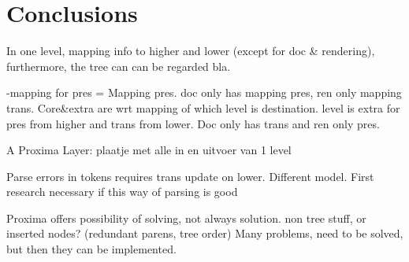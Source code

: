 %																
\section{Conclusions}

In one level,  mapping info to higher and lower (except for doc \& rendering), furthermore, the tree can can be regarded bla.

-mapping for pres = Mapping pres. doc only has mapping pres, ren only mapping trans. Core\&extra are wrt mapping of which level is destination. level is extra for pres from higher and trans from lower. Doc only has trans  and ren only pres.



A Proxima Layer:
plaatje met alle in en uitvoer van 1 level


Parse errors in tokens requires trans update on lower. Different model. First research necessary if this way of parsing is good

Proxima offers possibility of solving, not always solution. non tree stuff, or inserted nodes? (redundant parens, tree order) Many problems, need to be solved, but then they can be implemented.




%																
%																
%																
%
%



%																
%																
%																
%
%
%
